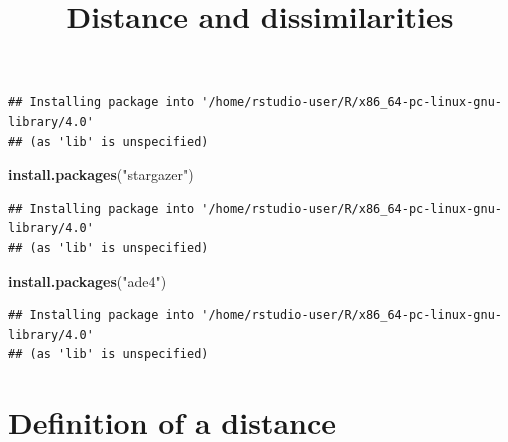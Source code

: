 \documentclass[
]{article}
\title{Distance and dissimilarities}
\author{}
\date{\vspace{-2.5em}}
\newenvironment{Shaded}{\begin{snugshade}}{\end{snugshade}}
\newcommand{\DataTypeTok}[1]{\textcolor[rgb]{0.13,0.29,0.53}{#1}}
\newcommand{\KeywordTok}[1]{\textcolor[rgb]{0.13,0.29,0.53}{\textbf{#1}}}
\newcommand{\NormalTok}[1]{#1}
\newcommand{\OperatorTok}[1]{\textcolor[rgb]{0.81,0.36,0.00}{\textbf{#1}}}
\newcommand{\OtherTok}[1]{\textcolor[rgb]{0.56,0.35,0.01}{#1}}
\newcommand{\StringTok}[1]{\textcolor[rgb]{0.31,0.60,0.02}{#1}}
\begin{document}
\maketitle

{
\setcounter{tocdepth}{2}
\tableofcontents
}
\begin{Shaded}
\end{Shaded}

\begin{verbatim}
## Installing package into '/home/rstudio-user/R/x86_64-pc-linux-gnu-library/4.0'
## (as 'lib' is unspecified)
\end{verbatim}

\begin{Shaded}
\begin{Highlighting}[]
\KeywordTok{install.packages}\NormalTok{(}\StringTok{"stargazer"}\NormalTok{)}
\end{Highlighting}
\end{Shaded}

\begin{verbatim}
## Installing package into '/home/rstudio-user/R/x86_64-pc-linux-gnu-library/4.0'
## (as 'lib' is unspecified)
\end{verbatim}

\begin{Shaded}
\begin{Highlighting}[]
\KeywordTok{install.packages}\NormalTok{(}\StringTok{"ade4"}\NormalTok{)}
\end{Highlighting}
\end{Shaded}

\begin{verbatim}
## Installing package into '/home/rstudio-user/R/x86_64-pc-linux-gnu-library/4.0'
## (as 'lib' is unspecified)
\end{verbatim}

\hypertarget{definition-of-a-distance}{%
\section{Definition of a distance}\label{definition-of-a-distance}}
\end{document}
